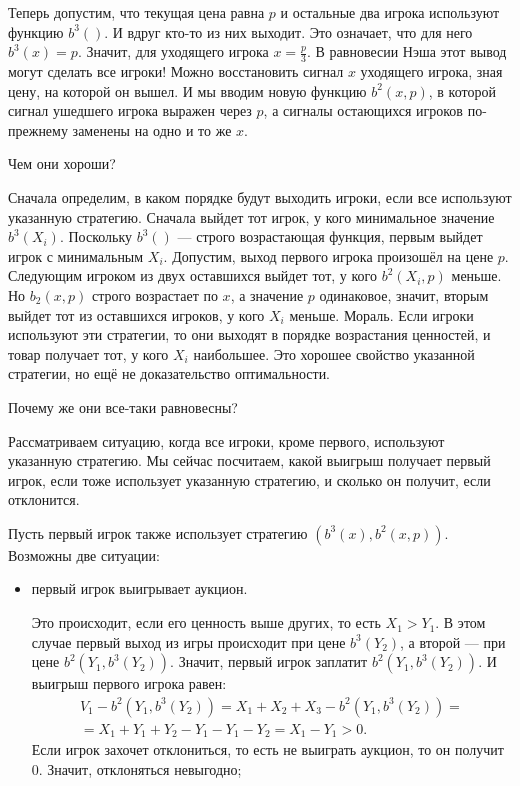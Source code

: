 \begin{myex}
Теперь допустим, что текущая цена равна $ p $ и остальные два игрока используют функцию $ b^{3}() $. И вдруг кто-то из них выходит. Это означает, что для него $ b^{3}(x)=p $. Значит, для уходящего игрока $ x=\frac{p}{3} $. В равновесии Нэша этот вывод могут сделать все игроки! Можно восстановить сигнал $ x $ уходящего игрока, зная цену, на которой он вышел. И мы вводим новую функцию $ b^{2}(x,p) $, в которой сигнал ушедшего игрока выражен через $ p $, а сигналы остающихся игроков по-прежнему заменены на одно и то же $ x $.

Чем они хороши?

Сначала определим, в каком порядке будут выходить игроки, если все используют указанную стратегию. Сначала выйдет тот игрок, у кого минимальное значение $ b^{3}(X_{i}) $. Поскольку $ b^{3}() $ — строго возрастающая функция, первым выйдет игрок с минимальным $ X_{i} $. Допустим, выход первого игрока произошёл на цене $ p $. Сле\-дую\-щим игроком из двух оставшихся выйдет тот, у кого $ b^{2}(X_{i},p) $ меньше. Но $ b_{2}(x,p) $ строго возрастает по $ x $, а значение $ p $ одинаковое, значит, вторым выйдет тот из оставшихся игроков, у кого $ X_{i} $ меньше. Мораль. Если игроки используют эти стратегии, то они выходят в порядке возрастания ценностей, и товар получает тот, у кого $ X_{i} $ наибольшее. Это хорошее свойство указанной стратегии, но ещё не доказательство оптимальности.

Почему же они все-таки равновесны?

Рассматриваем ситуацию, когда все игроки, кроме первого, используют указанную стратегию. Мы сейчас посчитаем, какой выигрыш получает первый игрок, если тоже использует указанную стратегию, и сколько он получит, если отклонится.

Пусть первый игрок также использует стратегию $ (b^{3}(x), b^{2}(x,p)) $. Возможны две ситуации:
\begin{itemize}
\item первый игрок выигрывает аукцион.

Это происходит, если его ценность выше других, то есть $ X_{1}>Y_{1} $. В этом случае первый выход из игры происходит при цене $ b^{3}(Y_{2}) $, а второй — при цене $ b^{2}(Y_{1},b^{3}(Y_{2})) $. Значит, первый игрок заплатит $ b^{2}(Y_{1},b^{3}(Y_{2})) $. И выигрыш первого игрока равен:
\begin{multline}
V_{1}-b^{2}(Y_{1},b^{3}(Y_{2}))=X_{1}+X_{2}+X_{3}-b^{2}(Y_{1},b^{3}(Y_{2}))=\\
=X_{1}+Y_{1}+Y_{2}-Y_{1}-Y_{1}-Y_{2}=X_{1}-Y_{1}>0.
\end{multline}
Если игрок захочет отклониться, то есть не выиграть аукцион, то он получит 0. Значит, отклоняться невыгодно;


\end{itemize}
\end{myex}
